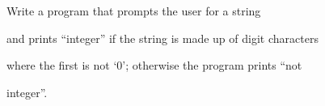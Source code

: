 Write a program that prompts the user for a string

and prints ``integer'' if the string is made up of digit characters

where the first is not `0'; otherwise the program prints ``not

integer''.

